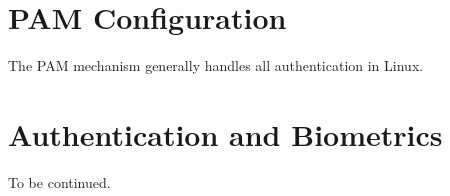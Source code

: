 \documentclass[
]{article}
\begin{document}
\begin{multicols}{2}
\section{PAM Configuration}
The PAM mechanism generally handles all authentication in Linux.  

\section{Authentication and Biometrics}
To be continued.

\end{multicols}



\end{document}
